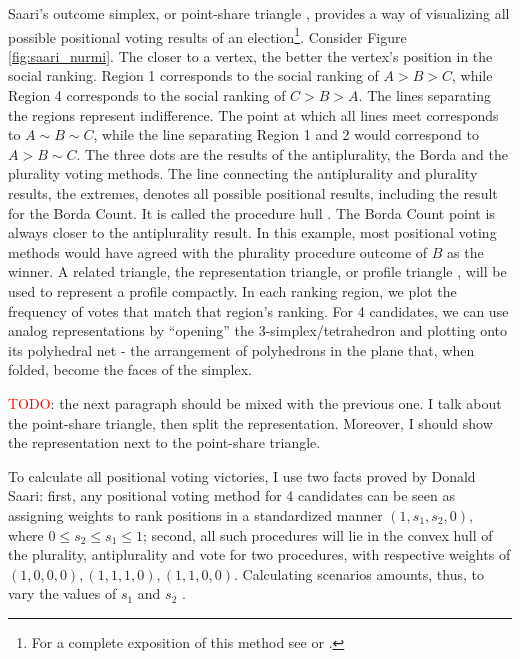 \documentclass[hidelinks,11pt]{article} \usepackage[utf8]{inputenc}
\begin{document}
Saari's outcome simplex, or point-share triangle
\parencite{eggers20_diagr_analy_ordin_votin_system}, provides a way of
visualizing all possible positional voting results of an election\footnote{For a
complete exposition of this method see \textcite{saari1995basic} or
\textcite{nurmi2002voting}.}. Consider Figure \ref{fig:saari_nurmi}. The closer
to a vertex, the better the vertex's position in the social ranking. Region 1
corresponds to the social ranking of \(A > B > C\), while Region 4 corresponds
to the social ranking of \(C>B>A\). The lines separating the regions represent
indifference. The point at which all lines meet corresponds to
\(A \sim B \sim C\), while the line separating Region 1 and 2 would correspond
to \(A > B \sim C\). The three dots are the results of the antiplurality, the
Borda and the plurality voting methods. The line connecting the antiplurality
and plurality results, the extremes, denotes all possible positional results,
including the result for the Borda Count. It is called the procedure hull
\parencite{saari2001chaotic}. The Borda Count point is always closer to the
antiplurality result. In this example, most positional voting methods would have
agreed with the plurality procedure outcome of \(B\) as the winner. A related
triangle, the representation triangle, or profile triangle
\parencite{eggers20_diagr_analy_ordin_votin_system}, will be used to represent a
profile compactly. In each ranking region, we plot the frequency of votes that
match that region's ranking. For 4 candidates, we can use analog representations
by ``opening'' the 3-simplex/tetrahedron and plotting onto its polyhedral net -
the arrangement of polyhedrons in the plane that, when folded, become the faces
of the simplex.

\textcolor{red}{TODO}: the next paragraph should be mixed with the previous one. I talk about the
point-share triangle, then split the representation. Moreover, I should show the
representation next to the point-share triangle.

To calculate all positional voting victories, I use two facts proved by Donald
Saari: first, any positional voting
method for 4 candidates can be seen as assigning weights to rank positions in a
standardized manner \((1,s_{1},s_{2},0)\), where
\(0 \leq s_{2} \leq s_{1} \leq 1\); second, all such procedures will lie in the
convex hull of the plurality, antiplurality and vote for two procedures, with
respective weights of \((1,0,0,0), (1,1,1,0), (1,1,0,0)\). Calculating scenarios
amounts, thus, to vary the values of \(s_{1}\) and \(s_{2}\) \parencite{saari1995basic, saari2001chaotic}.
\end{document}
